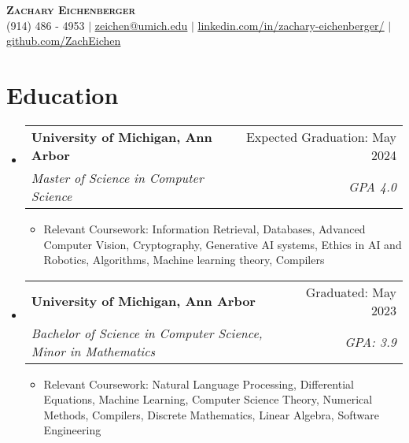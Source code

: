\documentclass[letterpaper,11pt]{article}
\makeatletter
\newcommand{\resumeItem}[1]{
  \item\small{
    {#1 \vspace{-2pt}}
  }
}
\newcommand{\resumeSubheading}[4]{
  \vspace{-2pt}\item
    \begin{tabular*}{0.97\textwidth}[t]{l@{\extracolsep{\fill}}r}
      \textbf{#1} & #2 \\
      \textit{\small#3} & \textit{\small #4} \\
    \end{tabular*}\vspace{-7pt}
}
\newcommand{\resumeSubHeadingListStart}{\begin{itemize}[leftmargin=0.15in, label={}]}
\newcommand{\resumeSubHeadingListEnd}{\end{itemize}}
\newcommand{\resumeItemListStart}{\begin{itemize}}
\newcommand{\resumeItemListEnd}{\end{itemize}\vspace{-5pt}}
\makeatother
\begin{document}

\begin{center}
    \textbf{\Huge \scshape Zachary Eichenberger} \\ \vspace{1pt}
    \small (914) 486 - 4953 $|$ \href{mailto:zeichen@umich.edu}{\underline{zeichen@umich.edu}} $|$ 
    \href{https://linkedin.com/in/zachry-eichenberger}{\underline{linkedin.com/in/zachary-eichenberger/}} $|$
    \href{https://github.com/zacheichen}{\underline{github.com/ZachEichen}}
\end{center}

\section{Education}
  \resumeSubHeadingListStart
      \resumeSubheading
      {University of Michigan, Ann Arbor}{Expected Graduation: May 2024}
      {Master of Science in Computer Science }{GPA 4.0}
      
    \resumeItemListStart
        \resumeItem{Relevant Coursework: Information Retrieval, Databases, Advanced Computer Vision, Cryptography, Generative AI systems, Ethics in AI and Robotics, Algorithms, Machine learning theory, Compilers}
    \resumeItemListEnd

    \resumeSubheading
      {University of Michigan, Ann Arbor}{Graduated: May 2023}
      {Bachelor of Science in Computer Science, Minor in Mathematics}{GPA: 3.9}
     
    \resumeItemListStart
        \resumeItem{Relevant Coursework: Natural Language Processing, Differential Equations, Machine Learning, Computer Science Theory, Numerical Methods, Compilers, Discrete Mathematics, Linear Algebra, Software Engineering}
    \resumeItemListEnd
  \resumeSubHeadingListEnd
\end{document}
